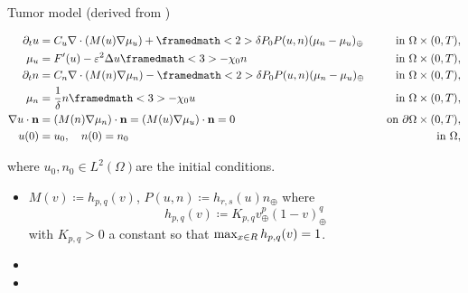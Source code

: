 \begin{frame}{Tumor model {\footnotesize (derived from \cite{van_der_zee_model})}}
	\footnotesize
	\vspace*{-0.2cm}
	\begin{block}{}
		\vspace*{-0.4cm}
		\begin{subequations}
			\begin{align*}
				\partial_t u&=C_u\nabla\cdot\left(M(u)\nabla\mu_u\right)+\framedmath<2>{\delta P_0P(u,n)(\mu_n-\mu_u)_\oplus} \quad&\text{in }\Omega\times (0,T),\\
				\mu_u&=F'(u)-\varepsilon^2\Delta u\framedmath<3>{-\chi_0 n}\quad&\text{in }\Omega\times (0,T),\\
				\partial_t n&=C_n\nabla\cdot\left(M(n)\nabla\mu_n\right)-\framedmath<2>{\delta P_0P(u,n)(\mu_n-\mu_u)_\oplus} \quad&\text{in }\Omega\times (0,T),\\
				\mu_n&=\frac{1}{\delta} n \framedmath<3>{-\chi_0 u} \quad&\text{in }\Omega\times (0,T),\\
				\nabla u\cdot \mathbf{n}&=\left( M(n)\nabla \mu_n\right)\cdot \mathbf{n}=\left( M(u)\nabla \mu_u\right)\cdot \mathbf{n}=0 \quad &\text{on }\partial\Omega\times (0,T),\\
				u(0)&=u_0,\quad n(0)=n_0\quad&\text{in }\Omega,%
			\end{align*}
		\end{subequations}
	\end{block}
	where $u_0,n_0\in L^2(\Omega)$are the initial conditions.
	
	\vspace*{0.2cm}
	\begin{itemize}
		\item $M(v)\coloneqq h_{p,q}(v)$, $P(u,n)\coloneqq h_{r,s}(u)n_\oplus$ where 
		$$
		h_{p,q}(v)\coloneqq K_{p,q}v_\oplus^p(1-v)_\oplus^q
		$$
		with $K_{p,q}>0$ a constant so that $\max_{x\in\relax R}h_{p,q}(v)=1$.
		\item<2> 
		\item<3> 
	\end{itemize}	
\end{frame}


